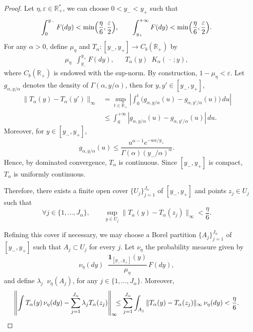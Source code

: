 \documentclass{article}
\DeclareMathOperator*{\eqdef }{\,\stackrel{\text{def}}{=}\,}
\newcommand{\R}{\mathbb{R}}
\begin{document}
\begin{proof}
Let $\eta,\varepsilon \in \R_{+}^*$, we can choose
$0<y_-<y_+$ such that
\[
\int_0^{y_-}F(dy)<\min \Bigl(\frac{\eta}{6},\frac{\varepsilon}{2}\Bigr),
\qquad
\int_{y_+}^{+\infty}F(dy)<\min \Bigl(\frac{\eta}{6},\frac{\varepsilon}{2}\Bigr).
\]
For any $\alpha > 0$, define $\mu_\eta$ and $T_\alpha:[y_-,y_+]\to C_b(\R_+)$ by
\begin{align*}
\mu_\eta \eqdef \int_{y_-}^{y_+}F(dy), &&  T_\alpha(y)\eqdef K_\alpha(\,\cdot\,;y),
\end{align*}
where $C_b(\R_+)$ is endowed with the sup-norm. By construction, $1-\mu_\eta <\varepsilon$.
Let $g_{\alpha,y/\alpha}$ denotes the density of $\Gamma(\alpha,y/\alpha)$, then
for $y,y'\in [y_-,y_+]$,
\begin{align*}
\|T_\alpha(y)-T_\alpha(y')\|_\infty
&=
\sup_{t \in \R_{+}}\left|\int_0^t
\bigl(g_{\alpha,y/\alpha}(u)-g_{\alpha,y'/\alpha}(u)\bigr)\,du\right| \\
&\le
\int_0^{+\infty}
\left|g_{\alpha,y/\alpha}(u)-g_{\alpha,y'/\alpha}(u)\right|\,du.
\end{align*}
Moreover, for $y\in [y_-,y_+]$,
\[
g_{\alpha,y/\alpha}(u)
\le
\frac{u^{\alpha-1}e^{-u\alpha/y_+}}
{\Gamma(\alpha)(y_-/\alpha)^\alpha}.
\]
Hence, by dominated
convergence, $T_\alpha$ is continuous. Since $[y_-,y_+]$ is compact,
$T_\alpha$ is uniformly continuous.

\medskip

Therefore, there exists a finite open cover
$\{U_j\}_{j=1}^{J_\alpha}$ of $[y_-,y_+]$ and points $z_j\in U_j$ such that
\[
\forall j\in\{1,\dots,J_\alpha\},\qquad
\sup_{y\in U_j}\|T_\alpha(y)-T_\alpha(z_j)\|_\infty<\frac{\eta}{6}.
\]

\medskip

Refining this cover if necessary, we may choose a Borel partition
$\{A_j\}_{j=1}^{J_\alpha}$ of $[y_-,y_+]$ such that $A_j\subset U_j$ for every
$j$. Let $\nu_\eta$ the probability measure given by
\[ \nu_\eta(dy)\eqdef \frac{\mathbf 1_{[y_-,y_+]}(y)}{\mu_\eta}\,F(dy),\]
and define $\lambda_j\eqdef \nu_\eta(A_j)$, for any $j \in \{1,\dots,J_\alpha \}$. Moreover,
\begin{align*}
\left\|
\int T_\alpha(y)\,\nu_\eta(dy)-\sum_{j=1}^{J_\alpha}\lambda_j T_\alpha(z_j)
\right\|_\infty \hspace{-0.5em} \le
\sum_{j=1}^{J_\alpha}\int_{A_j}
\|T_\alpha(y)-T_\alpha(z_j)\|_\infty\,\nu_\eta(dy) < \frac{\eta}{6}.
\end{align*}


\end{proof}
\end{document}
